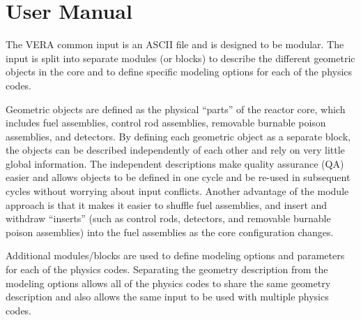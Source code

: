\documentclass[11pt]{caslreport}
\begin{document}
\clearpage
\mainmatter





\clearpage
\section{User Manual}
\label{chap:user}

The VERA common input is an ASCII file and is designed to be modular.
The input is split into separate modules
(or blocks) to describe the different geometric objects in the core and
to define specific modeling options for each of the physics codes.

Geometric objects are defined as the physical ``parts'' of the reactor core, which includes
fuel assemblies, control rod assemblies, removable burnable poison assemblies, and detectors.
By defining each geometric object as a separate block, the objects can be described
independently of each other and rely on very little global information.  The independent
descriptions make quality assurance (QA) easier and allows objects to be defined in one cycle
and be re-used in subsequent cycles without worrying about input conflicts.
Another advantage of the module approach is that it makes it easier to shuffle fuel assemblies,
and insert and withdraw ``inserts'' (such as control rods, detectors, and removable burnable
poison assemblies) into the fuel assemblies as the core configuration changes.

Additional modules/blocks are used to define modeling options and parameters for each of the physics
codes.  Separating the geometry description from the modeling options allows all of the
physics codes to share the same geometry description and also allows the same input to be
used with multiple physics codes.
\end{document}
